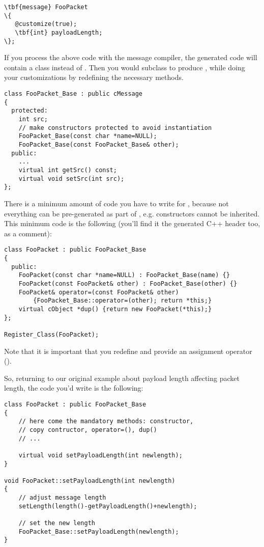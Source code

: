 \begin{Verbatim}[commandchars=\\\{\}]
\tbf{message} FooPacket
\{
   @customize(true);
   \tbf{int} payloadLength;
\};
\end{Verbatim}

If you process the above code with the message compiler,
the generated code will contain a  class
instead of . Then you would subclass
 to produce ,
while doing your customizations by redefining the necessary methods.

\begin{verbatim}
class FooPacket_Base : public cMessage
{
  protected:
    int src;
    // make constructors protected to avoid instantiation
    FooPacket_Base(const char *name=NULL);
    FooPacket_Base(const FooPacket_Base& other);
  public:
    ...
    virtual int getSrc() const;
    virtual void setSrc(int src);
};
\end{verbatim}

There is a minimum amount of code you have to write
for , because not everything can be
pre-generated as part of , e.g.
constructors cannot be inherited. This minimum
code is the following (you'll find it the generated C++ header
too, as a comment):

\begin{verbatim}
class FooPacket : public FooPacket_Base
{
  public:
    FooPacket(const char *name=NULL) : FooPacket_Base(name) {}
    FooPacket(const FooPacket& other) : FooPacket_Base(other) {}
    FooPacket& operator=(const FooPacket& other)
        {FooPacket_Base::operator=(other); return *this;}
    virtual cObject *dup() {return new FooPacket(*this);}
};

Register_Class(FooPacket);
\end{verbatim}

Note that it is important that you redefine  and
provide an assignment operator ().

So, returning to our original example about payload length
affecting packet length, the code you'd write is the following:

\begin{verbatim}
class FooPacket : public FooPacket_Base
{
    // here come the mandatory methods: constructor,
    // copy contructor, operator=(), dup()
    // ...

    virtual void setPayloadLength(int newlength);
}

void FooPacket::setPayloadLength(int newlength)
{
    // adjust message length
    setLength(length()-getPayloadLength()+newlength);

    // set the new length
    FooPacket_Base::setPayloadLength(newlength);
}
\end{verbatim}




